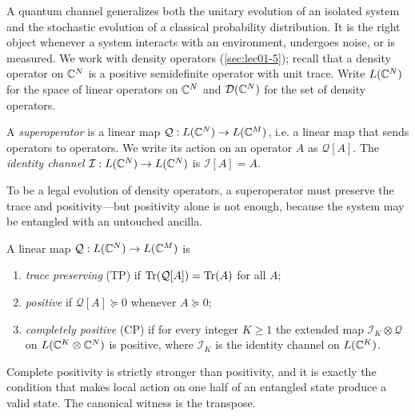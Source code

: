 A quantum channel generalizes both the unitary evolution of an isolated system
and the stochastic evolution of a classical probability distribution. It is the
right object whenever a system interacts with an environment, undergoes noise, or
is measured. We work with density operators (\cref{sec:lec01-5}); recall that a
density operator on $\mathbb{C}^{N}$ is a positive semidefinite operator with unit trace.
Write $L(\mathbb{C}^{N})$ for the space of linear operators on $\mathbb{C}^{N}$ and $\mathcal{D}(\mathbb{C}^{N})$
for the set of density operators.

\begin{definition}[Superoperator]\label{def:lec02-super}
A \emph{superoperator} is a linear map $\mathcal{Q}:L(\mathbb{C}^{N})\to L(\mathbb{C}^{M})$, i.e.
a linear map that sends operators to operators. We write its action on an
operator $A$ as $\mathcal{Q}[A]$. The \emph{identity channel}
$\mathcal{I}:L(\mathbb{C}^{N})\to L(\mathbb{C}^{N})$ is $\mathcal{I}[A]=A$.
\end{definition}

To be a legal evolution of density operators, a superoperator must preserve the
trace and positivity---but positivity alone is not enough, because the system may
be entangled with an untouched ancilla.

\begin{definition}\label{def:lec02-cp}
A linear map $\mathcal{Q}:L(\mathbb{C}^{N})\to L(\mathbb{C}^{M})$ is
\begin{enumerate}[label=(\roman*)]
  \item \emph{trace preserving} (TP) if $\operatorname{Tr}(\mathcal{Q}[A])=\operatorname{Tr}(A)$ for all $A$;
  \item \emph{positive} if $\mathcal{Q}[A]\succeq0$ whenever $A\succeq0$;
  \item \emph{completely positive} (CP) if for every integer $K\ge1$ the extended
        map $\mathcal{I}_K\otimes\mathcal{Q}$ on $L(\mathbb{C}^{K}\otimes\mathbb{C}^{N})$ is
        positive, where $\mathcal{I}_K$ is the identity channel on $L(\mathbb{C}^{K})$.
\end{enumerate}
\end{definition}

Complete positivity is strictly stronger than positivity, and it is exactly the
condition that makes local action on one half of an entangled state produce a
valid state. The canonical witness is the transpose.


